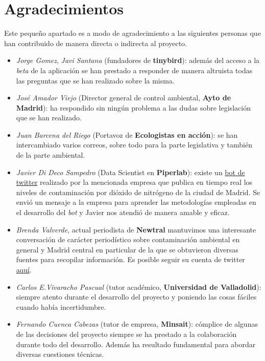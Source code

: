 \section{Agradecimientos}\label{reconocimientos}
Este pequeño apartado es a modo de agradecimiento a las siguientes personas que han contribuido de manera directa o indirecta al proyecto.
\begin{itemize}
	\item \textit{Jorge Gomez}, \textit{Javi Santana} (fundadores de \textbf{tinybird}): además del acceso a la \textit{beta} de la aplicación se han prestado a responder de manera altruista todas las preguntas que se han realizado sobre la misma.
	\item \textit{José Amador Viejo} (Director general de control ambiental, \textbf{Ayto de Madrid}): ha respondido sin ningún problema a las dudas sobre legislación que se han realizado.
	\item \textit{Juan Barcena del Riego} (Portavoz de \textbf{Ecologistas en acción}): se han intercambiado varios correos, sobre todo para la parte legislativa y también de la parte ambiental.
	\item \textit{Javier Di Deco Sampedro} (Data Scientist en \textbf{Piperlab}): existe un \href{https://twitter.com/datoxnitro_bot}{bot de twitter} realizado por la mencionada empresa que publica en tiempo real los niveles de contaminación por dióxido de nitrógeno de la ciudad de Madrid. Se envió un mensaje a la empresa para aprender las metodologías empleadas en el desarrollo del \textit{bot} y Javier nos atendió de manera amable y eficaz.
	\item \textit{Brenda Valverde}, actual periodista de \textbf{Newtral} mantuvimos una interesante conversación de carácter periodístico sobre contaminación ambiental en general y Madrid central en particular de la que se obtuvieron diversas fuentes para recopilar información. Es posible seguir su cuenta de twitter \href{https://twitter.com/brbrebren}{aquí}.
	\item \textit{Carlos E.Vivaracho Pascual} (tutor académico, \textbf{Universidad de Valladolid}): siempre atento durante el desarrollo del proyecto y poniendo las cosas fáciles cuando había incertidumbre.
    \item \textit{Fernando Cuenca Cabezas} (tutor de empresa, \textbf{Minsait}): cómplice de algunas de las decisiones del proyecto siempre se ha prestado a la colaboración durante todo del desarrollo. Además ha resultado fundamental para abordar diversas cuestiones técnicas.
\end{itemize}

